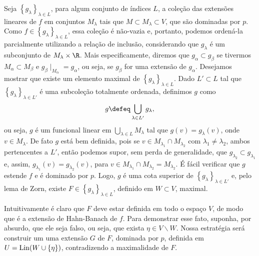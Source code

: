Seja \( \left\{ g_{ \lambda } \right\}_{ \lambda \in L } \), para algum conjunto de índices \( L \), a coleção das extensões lineares de \( f \) em conjuntos \( M_{ \lambda } \) tais que \( M \subset  M_{ \lambda } \subset V \), que são dominadas por \( p \).
Como \( f \in \left\{ g_{ \lambda } \right\}_{ \lambda \in L } \), essa coleção é não-vazia e, portanto, podemos ordená-la parcialmente utilizando a relação de inclusão, considerando que \( g_{ \lambda } \) é um subconjunto de \( M_{ \lambda } \times \R \).
Mais especificamente, diremos que \( g_{ \alpha } \subset g_{ \beta } \) se tivermos \( M_{ \alpha } \subset M_{ \beta } \) e \( g_{ \beta } \mid_{ M_{ \alpha } } = g_{ \alpha } \), ou seja, se \( g_{ \beta } \) for uma extensão de \( g_{ \alpha } \).
Desejamos mostrar que existe um elemento maximal de \( \left\{ g_{ \lambda } \right\}_{ \lambda \in L } \).
Dado \( L' \subset L \) tal que \( \left\{ g_{ \lambda } \right\}_{ \lambda \in L' } \) é uma subcoleção totalmente ordenada, definimos \( g \) como \[
    g \defeq \bigcup_{ \lambda \in L' } g_{ \lambda }
,\]
ou seja, \( g \) é um funcional linear em \( \bigcup_{ \lambda \in L } M_{ \lambda } \) tal que \( g(v) = g_{ \lambda } (v) \), onde \( v \in M_{ \lambda } \).
De fato \( g \) está bem definida, pois se \( v \in M_{ \lambda_{ 1 } } \cap M_{ \lambda_{ 2 } } \) com \( \lambda_{ 1 } \neq \lambda_{ 2 } \), ambos pertencentes a \( L' \), então podemos supor, sem perda de generalidade, que \( g_{ \lambda_{ 2 } } \subset g_{ \lambda_{ 1 } } \) e, assim, \( g_{ \lambda_{ 1 } } (v) = g_{ \lambda_{ 2 } }(v) \), para \( v \in M_{ \lambda_{ 1 } } \cap M_{ \lambda_{ 2 } } = M_{ \lambda_{ 2 } } \). 
É fácil verificar que \( g \) estende \( f \) e é dominado por \( p \).
Logo, \( g \) é uma cota superior de \( \left\{ g_{ \lambda } \right\}_{ \lambda \in L' } \) e, pelo lema de Zorn, existe \( F \in \left\{ g_{ \lambda } \right\}_{ \lambda \in L } \), definido em \( W \subset  V \), maximal.

Intuitivamente é claro que \( F \) deve estar definida em todo o espaço \( V \), de modo que é a extensão de Hahn-Banach de \( f \).
Para demonstrar esse fato, suponha, por absurdo, que ele seja falso, ou seja, que exista \( \eta \in V \backslash W \).
Nossa estratégia será construir um uma extensão \( G \) de \( F \), dominada por \( p \), definida em \( U = \operatorname{Lin} (W \cup \left\{ \eta \right\}) \), contradizendo a maximalidade de \( F \).

